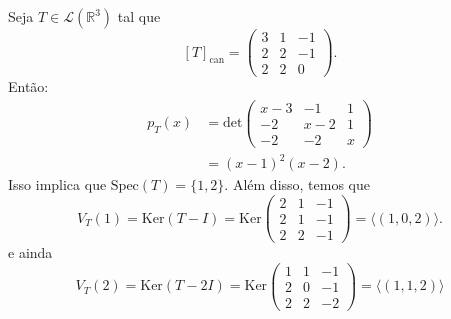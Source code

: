 \documentclass[11pt,twoside,a4paper]{book}
\begin{document}
\begin{exemplo}
Seja \(T\in\mathcal{L}(\mathbb{R}^3)\) tal que\[[T]_{\text{can}}=\begin{pmatrix}
3 & 1 & -1\\2 & 2 & -1\\ 2 & 2 & 0
\end{pmatrix}.\]
Então:
\begin{align*}
p_T(x)&=\text{det}\begin{pmatrix}
x-3 & -1 & 1 \\ -2 & x-2 & 1 \\ -2 & -2 & x
\end{pmatrix}\\&=(x-1)^2(x-2).
\end{align*}
Isso implica que \(\text{Spec}(T)=\{1,2\}\). Além disso, temos que
\[V_T(1)=\text{Ker}(T-I)=\text{Ker}\begin{pmatrix}
2 & 1 & -1\\2 & 1 & -1\\ 2 & 2 & -1
\end{pmatrix}=\langle (1,0,2)\rangle.\]
e ainda
\[V_T(2)=\text{Ker}(T-2 I)=\text{Ker}\begin{pmatrix}
1 & 1 & -1\\2 & 0 & -1\\ 2 & 2 & -2
\end{pmatrix}=\langle (1,1,2)\rangle\]
\end{exemplo}
\end{document}

